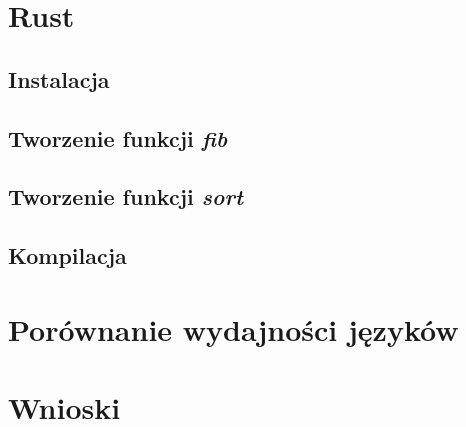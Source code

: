 \documentclass[language=polish,type=master]{aghmodern}
\begin{document}
\section{Rust}

\subsection{Instalacja}

\subsection{Tworzenie funkcji \emph{fib}}

\subsection{Tworzenie funkcji \emph{sort}}

\subsection{Kompilacja}

\section{Porównanie wydajności języków}

\section{Wnioski}





\end{document}
